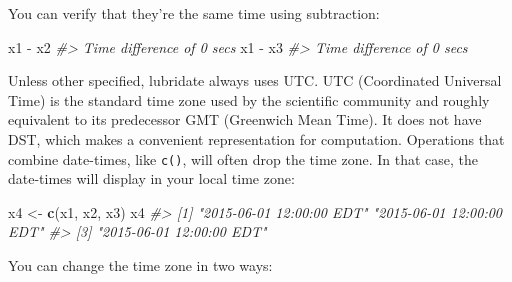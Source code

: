 \documentclass[]{book}
\newenvironment{Shaded}{\begin{snugshade}}{\end{snugshade}}
\newcommand{\KeywordTok}[1]{\textcolor[rgb]{0.13,0.29,0.53}{\textbf{{#1}}}}
\newcommand{\StringTok}[1]{\textcolor[rgb]{0.31,0.60,0.02}{{#1}}}
\newcommand{\CommentTok}[1]{\textcolor[rgb]{0.56,0.35,0.01}{\textit{{#1}}}}
\newcommand{\NormalTok}[1]{{#1}}
\begin{document}
You can verify that they're the same time using subtraction:

\begin{Shaded}
\begin{Highlighting}[]
\NormalTok{x1 -}\StringTok{ }\NormalTok{x2}
\CommentTok{#> Time difference of 0 secs}
\NormalTok{x1 -}\StringTok{ }\NormalTok{x3}
\CommentTok{#> Time difference of 0 secs}
\end{Highlighting}
\end{Shaded}

Unless other specified, lubridate always uses UTC. UTC (Coordinated
Universal Time) is the standard time zone used by the scientific
community and roughly equivalent to its predecessor GMT (Greenwich Mean
Time). It does not have DST, which makes a convenient representation for
computation. Operations that combine date-times, like \texttt{c()}, will
often drop the time zone. In that case, the date-times will display in
your local time zone:

\begin{Shaded}
\begin{Highlighting}[]
\NormalTok{x4 <-}\StringTok{ }\KeywordTok{c}\NormalTok{(x1, x2, x3)}
\NormalTok{x4}
\CommentTok{#> [1] "2015-06-01 12:00:00 EDT" "2015-06-01 12:00:00 EDT"}
\CommentTok{#> [3] "2015-06-01 12:00:00 EDT"}
\end{Highlighting}
\end{Shaded}

You can change the time zone in two ways:
\end{document}
